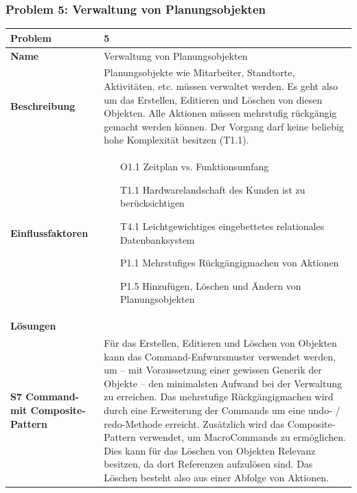 \documentclass[fontsize=12pt,paper=a4,twoside]{scrartcl}
\begin{document}
\subsubsection{Problem 5: Verwaltung von Planungsobjekten}
\begin{tabularx}{\textwidth}{|p{6cm}|X|}
 \hline
 \textbf{Problem} & 5\\\hline
 \textbf{Name} & Verwaltung von Planungsobjekten\\\hline 
 \textbf{Beschreibung} & Planungsobjekte wie Mitarbeiter, Standtorte, Aktivitäten, etc. müssen verwaltet werden. Es geht also um das Erstellen, Editieren und Löschen von diesen Objekten. Alle Aktionen müssen mehrstufig rückgängig gemacht werden können. Der Vorgang darf keine beliebig hohe Komplexität besitzen (T1.1).\\\hline
 \textbf{Einflussfaktoren} &
 \begin{itemize}
\item[O1.1] Zeitplan vs. Funktionsumfang
\item[T1.1] Hardwarelandschaft des Kunden ist zu berücksichtigen
\item[T4.1] Leichtgewichtiges eingebettetes relationales Datenbanksystem
\item[P1.1] Mehrstufiges Rückgängigmachen von Aktionen
\item[P1.5] Hinzufügen, Löschen und Ändern von Planungsobjekten
 \end{itemize}\\\hline
\multicolumn{2}{|l|}{\textbf{Lösungen}} \\\hline

\textbf{S7 Command- mit Composite-Pattern} & Für das Erstellen, Editieren und Löschen von Objekten kann das Command-Enfwursmuster verwendet werden, um -- mit Voraussetzung einer gewissen Generik der Objekte -- den minimalsten Aufwand  bei der Verwaltung zu erreichen. Das mehrstufige Rückgängigmachen wird durch eine Erweiterung der Commands um eine undo- / redo-Methode erreicht. Zusätzlich wird das Composite-Pattern verwendet, um MacroCommands zu ermöglichen. Dies kann für das Löschen von Objekten Relevanz besitzen, da dort Referenzen aufzulösen sind. Das Löschen besteht also aus einer Abfolge von Aktionen.\\\hline

\end{tabularx}
\end{document}
